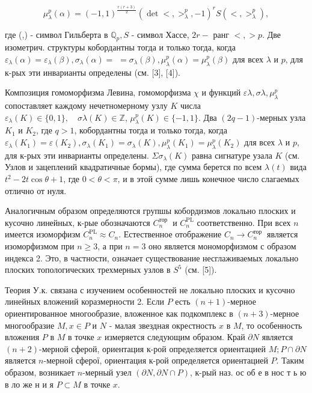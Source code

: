 \documentclass[10pt]{article}
\begin{document}
\[

\mu_{\lambda}^{p}(\alpha)=(-1,1)^{\frac{r(r+3)}{2}}\left(\operatorname{det}<,>_{\lambda}^{p},-1\right)^{r} S\left(<,>_{\lambda}^{p}\right),

\]



где (,) - символ Гильберта в $\mathbb{Q}_{p}, S$ - символ Хассе, $2 r-$ ранг $<,>p$. Две изометрич. структуры кобордантны тогда и только тогда, когда $\varepsilon_{\lambda}(\alpha)=\varepsilon_{\lambda}(\beta), \sigma_{\lambda}(\alpha)=$ $=\sigma_{\lambda}(\beta), \mu_{\lambda}^{p}(\alpha)=\mu_{\lambda}^{p}(\beta)$ для всех $\lambda$ и $p$, для к-рых эти инварианты определены (см. [3], [4]).



Композиция гомоморфизма Левина, гомоморфизма $\chi$ и функций $\varepsilon \lambda, \sigma \lambda, \mu_{\lambda}^{p}$ сопоставляет каждому нечетномерному узлу $K$ числа $\varepsilon_{\lambda}(K) \in\{0,1\}, \quad \sigma \lambda(K) \in \mathbb{Z}$, $\mu_{\lambda}^{p}(K) \in\{-1,1\}$. Два $(2 q-1)$-мерных узла $K_{1}$ и $K_{2}$, где $q>1$, кобордантны тогда и только тогда, когда $\varepsilon_{\lambda}\left(K_{1}\right)=\varepsilon\left(K_{2}\right), \sigma_{\lambda}\left(K_{1}\right)=\sigma_{\lambda}(K), \mu_{\lambda}^{p}\left(K_{1}\right)=\mu_{\lambda}^{p}\left(K_{2}\right)$ для всех $\lambda$ и $p$, для к-рых эти инварианты определены. $\Sigma \sigma_{\lambda}(K)$ равна сигнатуре узала $K$ (см. Узлов и зацеплений квадратичные бормы), где сумма берется по всем $\lambda(t)$ вида $t^{2}-2 t \cos \theta+1$, где $0<\theta<\pi$, и в этой сумме лишь конечное число слагаемых отлично от нуля.



Аналогичным образом определяются групшы кобордизмов локально плоских и кусочно линейных, к-рые обозначаются $C_{n}^{\text {тор }}$ и $C_{n}^{\mathrm{PL}}$ соответственно. При всех $n$ имеется изоморфизм $C_{n}^{\mathrm{PL}} \approx C_{n}$. Естественное отображение $C_{n} \rightarrow C_{n}^{\text {тор }}$ является изоморфизмом при $n \geqslant 3$, а при $n=3$ оно является мономорфизмом с образом индекса 2. Это, в частности, означает существование несглаживаемых локально плоских топологических трехмерных узлов в $S^{5}$ (см. [5]).



Теория У.к. связана с изучением особенностей не локально плоских и кусочно линейных вложений коразмерности 2. Если $P$ есть $(n+1)$-мерное ориентированное многообразие, вложенное как подкомплекс в $(n+3)$-мерное многообразие $M, x \in P$ и $N$ - малая звездная окрестность $x$ в $M$, то особенность вложения $P$ в $M$ в точке $x$ измеряется следующим образом. Край $\partial N$ является $(n+2)$-мерной сферой, ориентация к-рой определяется ориентацией $M ; P \cap \partial N$ является $n$-мерной сферої, ориентация к-рой определяется ориентацией $P$. Таким образом, возникает $n$-мерный узел $(\partial N, \partial N \cap P)$, к-рый наз. ос об е в нос т ь ю в ло же н и я $P \subset M$ в точке $x$.
\end{document}
